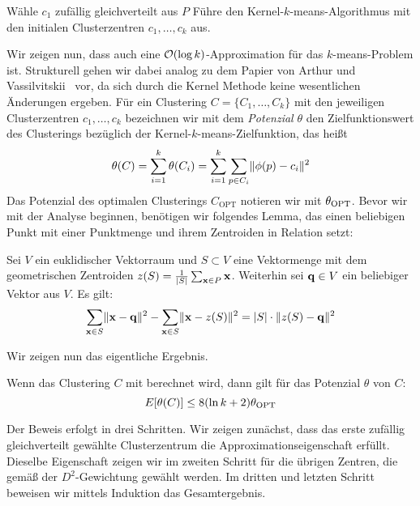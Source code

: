 \begin{algorithm}
\label{algo:kernelkmeanspp}
\caption{\kkmpp}
	\DontPrintSemicolon
	
	\BlankLine
	
	Wähle $c_1$ zufällig gleichverteilt aus $P$\;
	Führe den Kernel-$k$-means-Algorithmus mit den initialen Clusterzentren $c_1, \dots, c_k$ aus.
\end{algorithm}
Wir zeigen nun, dass auch \kkmpp{} eine $\mathcal{O}(\log k)$-Approximation für das $k$-means-Problem ist. Strukturell gehen
wir dabei analog zu dem Papier von Arthur und Vassilvitskii~\cite{ArthurV07} vor, da sich durch die Kernel Methode keine
wesentlichen Änderungen ergeben. Für ein Clustering $C = \{ C_1, \dots, C_k \}$ mit den jeweiligen Clusterzentren
$c_1, \dots, c_k$ bezeichnen wir mit dem \emph{Potenzial} $\theta$ den Zielfunktionswert des Clusterings bezüglich der
Kernel-$k$-means-Zielfunktion, das heißt
\[ \theta(C) = \sum_{i=1}^k \theta(C_i) = \sum_{i=1}^k \sum_{p \in C_i} \lVert {\phi(p)} - {c_i} \rVert^2 \]
Das Potenzial des optimalen Clusterings $C_\textrm{OPT}$ notieren wir mit $\theta_{\textrm{OPT}}$. Bevor wir mit der Analyse beginnen,
benötigen wir folgendes Lemma, das einen beliebigen Punkt mit einer Punktmenge und ihrem Zentroiden in Relation setzt:

\begin{lemma}
\label{lemma:point-centroid}
	Sei $V$ ein euklidischer Vektorraum und $S \subset V$ eine Vektormenge mit dem geometrischen
	Zentroiden $z(S) = \frac{1}{\left|S\right|} \sum_{\mathbf{x} \in P} \mathbf{x}$.
	Weiterhin sei $\mathbf{q} \in V$ ein beliebiger Vektor aus $V$. Es gilt:
	\[ \sum_{\mathbf{x} \in S} \lVert {\ensuremath{\mathbf{x}}} - {\mathbf{q}} \rVert^2 - \sum_{\mathbf{x} \in S} \lVert {\ensuremath{\mathbf{x}}} - {z(S)} \rVert^2
		= \left|S\right| \cdot \lVert {z(S)} - {\mathbf{q}} \rVert^2 \]
\end{lemma}
Wir zeigen nun das eigentliche Ergebnis.

\begin{satz}
\label{thm:kkmpp-ologk-approx}
	Wenn das Clustering $C$ mit \kkmpp{} berechnet wird, dann gilt für das Potenzial $\theta$ von $C$:
	\[ E[\theta(C)] \leq 8 (\ln{k} + 2) \theta_{\textrm{OPT}} \]
\end{satz}
Der Beweis erfolgt in drei Schritten. Wir zeigen zunächst, dass das erste zufällig gleichverteilt gewählte Clusterzentrum
die Approximationseigenschaft erfüllt. Dieselbe Eigenschaft zeigen wir im zweiten Schritt für die übrigen Zentren, die gemäß
der $D^2$-Gewichtung gewählt werden. Im dritten und letzten Schritt beweisen wir mittels Induktion das Gesamtergebnis.

